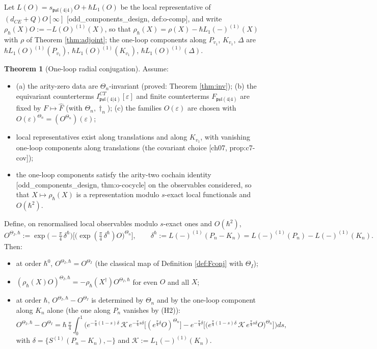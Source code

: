\documentclass[11pt]{article}
\theoremstyle{definition}
\newtheorem{theorem}[definition]{Theorem}
\begin{document}
Let $L(O)=s_{\mathfrak{psl}(4|4)}O+\hbar L_1(O)$ be the local representative of $(d_{CE}+Q)O[\infty]$ [odd\_components\_design, def:o-comp], and write $\rho_\hbar(X)O:=-L(O)^{(1)}(X)$, so that $\rho_\hbar(X)=\rho(X)-\hbar L_1(-)^{(1)}(X)$ with $\rho$ of Theorem \ref{thm:adjoint}; the one-loop components along $P_{v_1}$, $K_{v_1}$, $\Delta$ are $\hbar L_1(O)^{(1)}(P_{v_1})$, $\hbar L_1(O)^{(1)}(K_{v_1})$, $\hbar L_1(O)^{(1)}(\Delta)$.

\begin{theorem}[One-loop radial conjugation]
\label{thm:oneloop}
Assume:
\begin{itemize}
\item[(H1)] (a) the arity-zero data are $\Theta_n$-invariant (proved: Theorem \ref{thm:inv}); (b) the equivariant counterterms $I^{CT}_{\mathfrak{psl}(4|4)}[\varepsilon]$ and finite counterterms $F_{\mathfrak{psl}(4|4)}$ are fixed by $F\mapsto\widehat F$ (with $\Theta_n,\dagger_n$); (c) the families $O(\varepsilon)$ are chosen with $O(\varepsilon)^{\Theta_n}=(O^{\Theta_n})(\varepsilon)$;
\item[(H2)] local representatives exist along translations and along $K_{v_1}$, with vanishing one-loop components along translations (the covariant choice [ch07, prop:c7-cov]);
\item[(H3)] the one-loop components satisfy the arity-two cochain identity [odd\_components\_design, thm:o-cocycle] on the observables considered, so that $X\mapsto\rho_\hbar(X)$ is a representation modulo $s$-exact local functionals and $O(\hbar^2)$.
\end{itemize}
Define, on renormalised local observables modulo $s$-exact ones and $O(\hbar^2)$,
\[
O^{\Theta_I,\hbar}:=\exp\!\big(-\tfrac\pi4\,\delta^\hbar\big)\Big[\big(\exp(\tfrac\pi4\,\delta^\hbar)O\big)^{\Theta_n}\Big],\qquad \delta^\hbar:=L(-)^{(1)}(P_n-K_n)=L(-)^{(1)}(P_n)-L(-)^{(1)}(K_n).
\]
Then:
\begin{itemize}
\item[(i)] at order $\hbar^0$, $O^{\Theta_I,\hbar}=O^{\Theta_I}$ (the classical map of Definition \ref{def:Fconj} with $\Theta_I$);
\item[(ii)] $(\rho_\hbar(X)O)^{\Theta_I,\hbar}=-\rho_\hbar(X^\dagger)O^{\Theta_I,\hbar}$ for even $O$ and all $X$;
\item[(iii)] at order $\hbar$, $O^{\Theta_I,\hbar}-O^{\Theta_I}$ is determined by $\Theta_n$ and by the one-loop component along $K_n$ alone (the one along $P_n$ vanishes by (H2)):
\[
O^{\Theta_I,\hbar}-O^{\Theta_I}=\hbar\,\tfrac\pi4\int_0^1\Big(e^{-\frac\pi4(1-s)\delta}\,\mathcal K\,e^{-\frac\pi4s\delta}\big[(e^{\frac\pi4\delta}O)^{\Theta_n}\big]-e^{-\frac\pi4\delta}\Big[\big(e^{\frac\pi4(1-s)\delta}\,\mathcal K\,e^{\frac\pi4s\delta}O\big)^{\Theta_n}\Big]\Big)ds,
\]
with $\delta=\{S^{(1)}(P_n-K_n),-\}$ and $\mathcal K:=L_1(-)^{(1)}(K_n)$.
\end{itemize}
\end{theorem}
\end{document}
